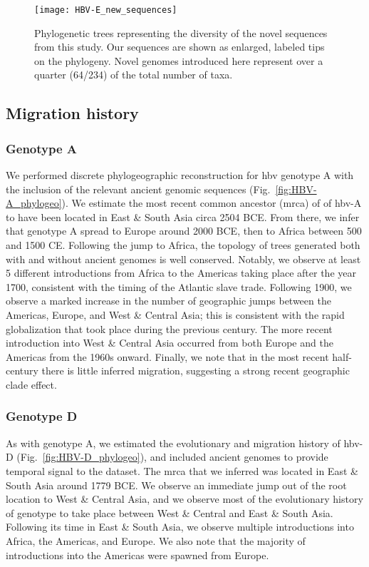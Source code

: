 \begin{figure}[ht]
  \centering
  \medskip
  \texttt{[image: HBV-E\_new\_sequences]}
  \caption[HBV-E New sequences]{Phylogenetic trees representing the diversity of the novel sequences from this study. Our sequences are shown as enlarged, labeled tips on the phylogeny. Novel genomes introduced here represent over a quarter (64/234) of the total number of taxa.}
  \label{fig:HBV-E_new_sequences}
\end{figure}

\subsection{Migration history}

\subsubsection{Genotype A}

We performed discrete phylogeographic reconstruction for \gls{hbv} genotype A with the inclusion of the relevant ancient genomic sequences (Fig.~\ref{fig:HBV-A_phylogeo}).
We estimate the most recent common ancestor (\gls{mrca}) of of \gls{hbv}-A to have been located in East \& South Asia circa 2504 BCE.
From there, we infer that genotype A spread to Europe around 2000 BCE, then to Africa between 500 and 1500 CE.
Following the jump to Africa, the topology of trees generated both with and without ancient genomes is well conserved.
Notably, we observe at least 5 different introductions from Africa to the Americas taking place after the year 1700, consistent with the timing of the Atlantic slave trade.
Following 1900, we observe a marked increase in the number of geographic jumps between the Americas, Europe, and West \& Central Asia; this is consistent with the rapid globalization that took place during the previous century.
The more recent introduction into West \& Central Asia occurred from both Europe and the Americas from the 1960s onward.
Finally, we note that in the most recent half-century there is little inferred migration, suggesting a strong recent geographic clade effect.

\subsubsection{Genotype D}

As with genotype A, we estimated the evolutionary and migration history of \gls{hbv}-D (Fig.~\ref{fig:HBV-D_phylogeo}), and included ancient genomes to provide temporal signal to the dataset.
The \gls{mrca} that we inferred was located in East \& South Asia around 1779 BCE.
We observe an immediate jump out of the root location to West \& Central Asia, and we observe most of the evolutionary history of genotype to take place between West \& Central and East \& South Asia.
Following its time in East \& South Asia, we observe multiple introductions into Africa, the Americas, and Europe.
We also note that the majority of introductions into the Americas were spawned from Europe.

